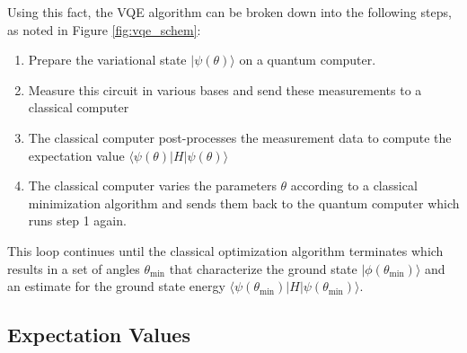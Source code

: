 \documentclass[10pt]{article}
\begin{document}
Using this fact, the VQE algorithm can be broken down into the following steps, as noted in Figure \ref{fig:vqe_schem}:
\begin{enumerate}
    \item Prepare the variational state $|\psi(\theta)\rangle$ on a quantum computer.
    \item Measure this circuit in various bases and send these measurements to a classical computer
    \item The classical computer post-processes the measurement data to compute the expectation value $\langle\psi(\theta)|H|\psi(\theta)\rangle$
    \item The classical computer varies the parameters $\theta$ according to a classical minimization algorithm and sends them back to the quantum computer which runs step 1 again.
\end{enumerate}
This loop continues until the classical optimization algorithm terminates which results in a set of angles $\theta_{\text{min}}$ that characterize the ground state $|\phi(\theta_{\text{min}})\rangle$ and an estimate for the ground state energy $\langle\psi(\theta_{\text{min}})|H|\psi(\theta_{\text{min}})\rangle$.

\subsection{Expectation Values}
\label{expectation_values}
\end{document}
